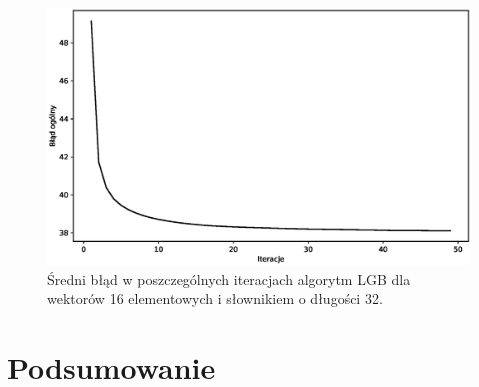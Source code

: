 \documentclass{article}
\begin{document}
\begin{figure}[H]
  \centering
  \includegraphics[width=.9\linewidth]{images/lbg_4x4_32_mean_iterations.eps}  
  \caption{Średni błąd w poszczególnych iteracjach algorytm LGB dla wektorów 16 elementowych i słownikiem o długości 32.}
  \label{fig:lbg_iterations_mean}
\end{figure}


\FloatBarrier
\section{Podsumowanie}

\lipsum[1-3]

  
\end{document}
